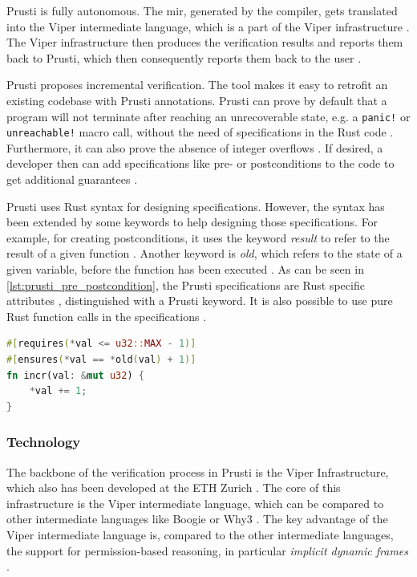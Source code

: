 Prusti is fully autonomous. The \acs{mir}, generated by the compiler, gets translated \cite{astrauskas_leveraging_2019} into the Viper intermediate language, which is a part of the Viper infrastructure \cite{jobstmann_viper_2016}. The Viper infrastructure then produces the verification results and reports them back to Prusti, which then consequently reports them back to the user \cite{astrauskas_leveraging_2019}.

Prusti proposes incremental verification. The tool makes it easy to retrofit an existing codebase with Prusti annotations. Prusti can prove by default that a program will not terminate after reaching an unrecoverable state, e.g. a \lstinline{panic!} or \lstinline{unreachable!} macro call, without the need of specifications in the Rust code \cite{deshmukh_prusti_2022}. Furthermore, it can also prove the absence of integer overflows \cite{deshmukh_prusti_2022}. If desired, a developer then can add specifications like pre- or postconditions to the code to get additional guarantees \cite{deshmukh_prusti_2022}.

Prusti uses Rust syntax for designing specifications. However, the syntax has been extended by some keywords to help designing those specifications. For example, for creating postconditions, it uses the keyword \textit{result} to refer to the result of a given function \cite{deshmukh_prusti_2022}. Another keyword is \textit{old}, which refers to the state of a given variable, before the function has been executed \cite{deshmukh_prusti_2022}. As can be seen in \autoref{lst:prusti_pre_postcondition}, the Prusti specifications are Rust specific attributes \cite{rust_foundation_attributes_nodate}, distinguished with a Prusti keyword. It is also possible to use pure Rust function calls in the specifications \cite{deshmukh_prusti_2022}. 

\begin{lstlisting}[float, language=Rust, caption=Example Rust code of an increase function with a pre- and postcondition for Prusti, label={lst:prusti_pre_postcondition}]
#[requires(*val <= u32::MAX - 1)]
#[ensures(*val == *old(val) + 1)]
fn incr(val: &mut u32) {
    *val += 1;
}
\end{lstlisting}

\subsubsection{Technology}
The backbone of the verification process in Prusti is the Viper Infrastructure, which also has been developed at the ETH Zurich \cite{jobstmann_viper_2016}. The core of this infrastructure is the Viper intermediate language, which can be compared to other intermediate languages like Boogie or Why3 \cite{jobstmann_viper_2016}. The key advantage of the Viper intermediate language is, compared to the other intermediate languages, the support for permission-based reasoning, in particular \textit{implicit dynamic frames} \cite{deshmukh_prusti_2022, astrauskas_leveraging_2019, jobstmann_viper_2016}.

